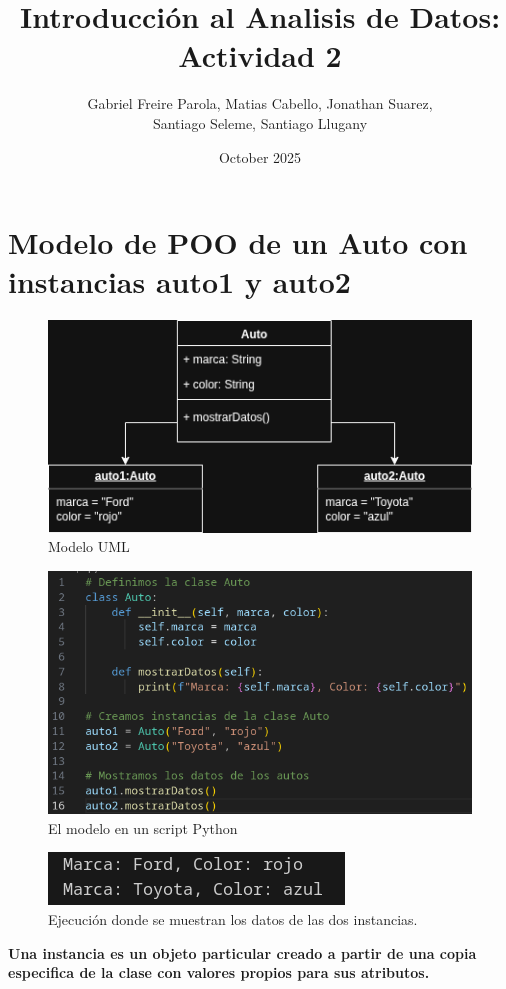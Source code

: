 \documentclass{article}
\title{Introducción al Analisis de Datos: Actividad 2}
\author{Gabriel Freire Parola, Matias Cabello, Jonathan Suarez, \\ Santiago Seleme, Santiago Llugany }
\date{October 2025}
\begin{document}
\maketitle

\section*{Modelo de POO de un Auto con instancias auto1 y auto2}
\begin{figure}[H]
    \centering
    \includegraphics[width=1\linewidth]{diagrama_UML.png}
    \caption{Modelo UML}
    \label{fig:placeholder}
\end{figure}
\begin{figure}[H]
    \centering
    \includegraphics[width=0.5\linewidth]{codigo.png}
    \caption{El modelo en un script Python}
    \label{fig:placeholder}
\end{figure}
\begin{figure}[H]
    \centering
    \includegraphics[width=0.5\linewidth]{ejecucion.png}
    \caption{Ejecución donde se muestran los datos de las dos instancias.}
    \label{fig:placeholder}
\end{figure}
\textbf{Una instancia es un objeto particular creado a partir de una copia especifica de la clase con valores propios para sus atributos.}
\end{document}
